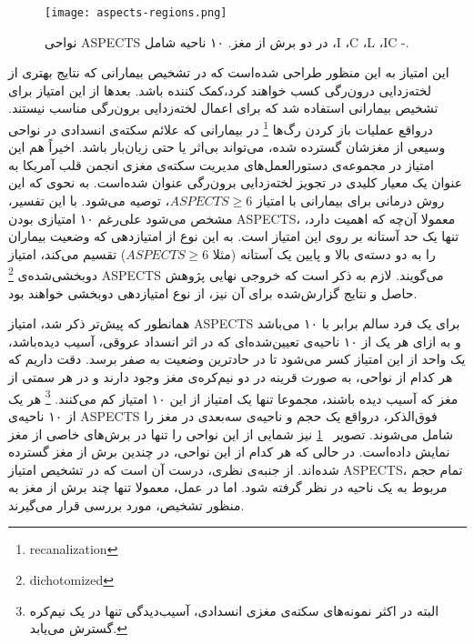 \begin{figure}[ht]
\centering
\texttt{[image: aspects-regions.png]}
\caption[]{نواحی ASPECTS در دو برش از مغز. ۱۰ ناحیه شامل ،I ،C ،L ،IC -.}
\label{fig:aspects-regions}
\end{figure}

این امتیاز 
به این منظور طراحی شده‌است که 
در تشخیص بیمارانی که نتایج بهتری از لخته‌زدایی درون‌رگی
کسب خواهند کرد،‌کمک کننده باشد.
بعد‌ها از این امتیاز برای تشخیص بیمارانی استفاده شد که برای اعمال لخته‌زدایی برون‌رگی مناسب نیستند.
درواقع عملیات باز کردن رگ‌ها 
\footnote{recanalization}
در بیمارانی که علائم سکته‌ی انسدادی در نواحی وسیعی از مغزشان گسترده شده، می‌تواند بی‌اثر یا حتی زیان‌بار باشد.
اخیراً هم این امتیاز در
مجموعه‌ی دستور‌العمل‌های مدیریت سکته‌ی مغزی
انجمن قلب آمریکا به عنوان 
 یک معیار کلیدی در تجویز 
 لخته‌زدایی برون‌رگی عنوان شده‌است.
 به نحوی که این روش درمانی برای بیمارانی با امتیاز $ASPECTS\geq 6$، توصیه می‌شود.
با این تفسیر، مشخص می‌شود علی‌رغم ۱۰ امتیازی بودن ASPECTS، معمولا آن‌چه که اهمیت دارد، تنها یک حد آستانه بر روی این امتیاز است.
به این نوع از امتیازدهی که وضعیت بیماران را به دو دسته‌ی بالا و پایین یک آستانه (مثلا $ASPECTS\geq6$) تقسیم می‌کند، امتیاز دوبخشی‌شده‌ی
\footnote{dichotomized}
ASPECTS می‌گویند.
لازم به ذکر است که خروجی نهایی پژوهش حاصل و نتایج گزارش‌شده برای آن نیز، از نوع امتیازدهی دو‌بخشی خواهند بود.


همانطور که پیش‌تر ذکر شد، امتیاز ASPECTS برای یک فرد سالم برابر با ۱۰ می‌باشد و به ازای هر یک از ۱۰ ناحیه‌ی تعیین‌شده‌ای که در اثر انسداد عروقی، آسیب دیده‌باشد، یک واحد از این امتیاز کسر می‌شود تا در حادترین وضعیت به صفر برسد.
دقت داریم که هر کدام از نواحی، به صورت قرینه در دو نیم‌کره‌ی مغز وجود دارند و در هر سمتی از مغز که آسیب دیده باشند، مجموعا تنها یک امتیاز از این ۱۰ امتیاز کم می‌کنند.
\footnote{البته در اکثر نمونه‌های سکته‌ی مغزی انسدادی، آسیب‌دیدگی تنها در یک نیم‌کره گسترش می‌یابد.}
هر یک از ۱۰ ناحیه‌ی ASPECTS فوق‌الذکر، درواقع یک حجم و ناحیه‌ی سه‌بعدی در مغز را شامل می‌شوند.
تصویر ~\ref{fig:aspects-regions} نیز شمایی از این نواحی را تنها در برش‌های خاصی از مغز نمایش داده‌است.
در حالی که هر کدام از این نواحی، در چندین برش از مغز گسترده شده‌اند.
از جنبه‌ی نظری، درست آن است که در تشخیص امتیاز ASPECTS، تمام حجم مربوط به یک ناحیه در نظر گرفته شود.
اما در عمل، معمولا تنها چند برش از مغز به منظور تشخیص، مورد بررسی قرار می‌گیرند.\\

